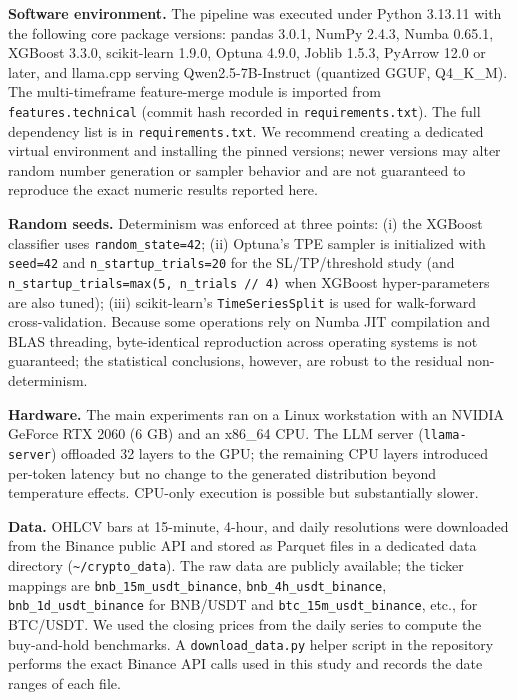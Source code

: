 \documentclass[analytics,article,submit,pdftex,moreauthors]{Definitions/mdpi}
\begin{document}
\textbf{Software environment.} The pipeline was executed under Python 3.13.11 with the following core package versions: pandas 3.0.1, NumPy 2.4.3, Numba 0.65.1, XGBoost 3.3.0, scikit-learn 1.9.0, Optuna 4.9.0, Joblib 1.5.3, PyArrow 12.0 or later, and llama.cpp serving Qwen2.5-7B-Instruct (quantized GGUF, Q4\_K\_M). The multi-timeframe feature-merge module is imported from \texttt{features.technical} (commit hash recorded in \texttt{requirements.txt}). The full dependency list is in \texttt{requirements.txt}. We recommend creating a dedicated virtual environment and installing the pinned versions; newer versions may alter random number generation or sampler behavior and are not guaranteed to reproduce the exact numeric results reported here.

\textbf{Random seeds.} Determinism was enforced at three points: (i) the XGBoost classifier uses \texttt{random\_state=42}; (ii) Optuna's TPE sampler is initialized with \texttt{seed=42} and \texttt{n\_startup\_trials=20} for the SL/TP/threshold study (and \texttt{n\_startup\_trials=max(5,\ n\_trials\ //\ 4)} when XGBoost hyper-parameters are also tuned); (iii) scikit-learn's \texttt{TimeSeriesSplit} is used for walk-forward cross-validation. Because some operations rely on Numba JIT compilation and BLAS threading, byte-identical reproduction across operating systems is not guaranteed; the statistical conclusions, however, are robust to the residual non-determinism.

\textbf{Hardware.} The main experiments ran on a Linux workstation with an NVIDIA GeForce RTX 2060 (6 GB) and an x86\_64 CPU. The LLM server (\texttt{llama-server}) offloaded 32 layers to the GPU; the remaining CPU layers introduced per-token latency but no change to the generated distribution beyond temperature effects. CPU-only execution is possible but substantially slower.

\textbf{Data.} OHLCV bars at 15-minute, 4-hour, and daily resolutions were downloaded from the Binance public API and stored as Parquet files in a dedicated data directory (\texttt{\textasciitilde{}/crypto\_data}). The raw data are publicly available; the ticker mappings are \texttt{bnb\_15m\_usdt\_binance}, \texttt{bnb\_4h\_usdt\_binance}, \texttt{bnb\_1d\_usdt\_binance} for BNB/USDT and \texttt{btc\_15m\_usdt\_binance}, etc., for BTC/USDT. We used the closing prices from the daily series to compute the buy-and-hold benchmarks. A \texttt{download\_data.py} helper script in the repository performs the exact Binance API calls used in this study and records the date ranges of each file.
\end{document}
